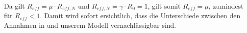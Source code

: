 \documentclass[a4paper]{article}
\begin{document}
    Da gilt $R_{eff} = \mu \cdot R_{eff,N}$ und $ R_{eff,N} = \gamma \cdot R_0 = 1 $, gilt somit $R_{eff} = \mu$, zumindest für $R_{eff} < 1$. Damit wird sofort ersichtlich, dass die Unterschiede zwischen den Annahmen in \cite{althausTwitter} und unserem Modell vernachlässigbar sind. 

    \printbibliography
\end{document}
